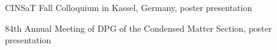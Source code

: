 \begin{minipage}[t]{0.70\textwidth}
\begin{tightemize}
\end{tightemize}
\begin{tightemize}
\item CINSaT Fall Colloquium in Kassel, Germany, poster presentation 
\end{tightemize}
\begin{tightemize}
\item 84th Annual Meeting of DPG of the Condensed Matter Section, poster presentation
\end{tightemize}

\end{minipage}
